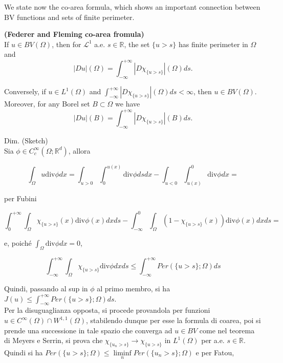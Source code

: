 We state now the co-area formula, which shows an important connection between BV functions and sets of finite perimeter.




















\begin{theorem} \label{Federer-Fleming co-area} {\bf (Federer and Fleming co-area fromula)}
\\
If $u \in BV(\Omega)$, then for $\mathcal{L}^{1}$ a.e. $s \in \mathbb{R}$, the set $\{ u > s \}$ has finite perimeter in $\Omega$ and
\[ |Du|(\Omega) = \int_{-\infty}^{+\infty} |D\chi_{\{u > s\}}|(\Omega) ds. \]

Conversely, if $u \in L^{1}(\Omega)$ and $\int_{-\infty}^{+\infty} |D\chi_{\{u > s\}}|(\Omega) ds < \infty$, then $u \in BV(\Omega)$.
\\
Moreover, for any Borel set $B \subset \Omega$ we have
\[ |Du|(B) = \int_{-\infty}^{+\infty} |D\chi_{\{u > s\}}|(B) ds. \]
\end{theorem}
Dim. (Sketch)
\\

Sia $\phi \in C_{c}^{\infty}(\Omega; \mathbb{R}^{d})$, allora

\[ \int_{\Omega} u\mathrm{div}\phi dx = \int_{u > 0} \int_{0}^{u(x)} \mathrm{div}\phi ds dx - \int_{u < 0} \int_{u(x)}^{0} \mathrm{div}\phi dx = \]
 
 per Fubini

\[ \int_{0}^{+\infty} \int_{\Omega} \chi_{\{u > s\}}(x) \mathrm{div}\phi(x) dx ds - \int_{-\infty}^{0} \int_{\Omega} (1 - \chi_{\{u > s\}}(x)) \mathrm{div}\phi(x) dx ds =\]

e, poiché $\int_{\Omega} \mathrm{div}\phi dx = 0$,

\[ \int_{-\infty}^{+\infty} \int_{\Omega} \chi_{\{u > s\}} \mathrm{div} \phi dx ds \le \int_{-\infty}^{+\infty} Per( \{u > s\}; \Omega) ds \]

Quindi, passando al sup in $\phi$ al primo membro, si ha $J(u) \le \int_{-\infty}^{+\infty} Per( \{u > s\}; \Omega) ds$.
\\
Per la disuguaglianza opposta, si procede provandola per funzioni $u \in C^{\infty}(\Omega) \cap W^{1,1}(\Omega)$, stabilendo dunque per esse la formula di coarea, poi si prende una successione in tale spazio che converga ad $u \in BV$ come nel teorema di Meyers e Serrin, si prova che $\chi_{\{u_{n} > s\}} \to \chi_{\{u > s\}}$ in $L^{1}(\Omega)$ per a.e. $s \in \mathbb{R}$. Quindi si ha $Per(\{u > s\}; \Omega) \le \liminf\limits_{n} Per(\{u_{n} > s\}; \Omega)$ e per Fatou,

